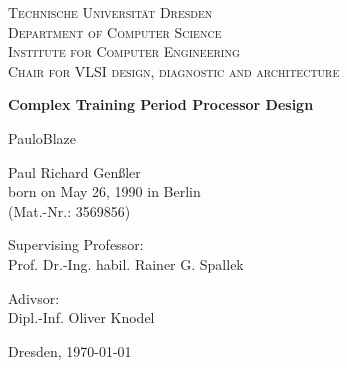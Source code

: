 \documentclass[11pt, a4paper, twoside, cleardoubleempty, openright, pointlessnumbers]{scrreprt} %
\newcommand{\getTitle}{PauloBlaze}
\begin{document}
		
	\begin{center}
	\thispagestyle{empty}
	\mbox{}
	\vspace{3\baselineskip}
	
	\textsc{\Large Technische Universität Dresden\\
		Department of Computer Science\\
		Institute for Computer Engineering\\
		Chair for VLSI design, diagnostic and architecture\\ \vspace{2\baselineskip} }
		
	\vspace{2\baselineskip}
		
	\textbf{\LARGE Complex Training Period Processor Design \vspace{\baselineskip}}
	
	\vspace{2\baselineskip}
	
	\Large \getTitle{}

	\vspace{2\baselineskip}
		
	\large Paul Richard Genßler\\
	\small born on May 26, 1990 in Berlin\\
	\small (Mat.-Nr.: 3569856)\\
	\vspace{2\baselineskip}


	\end{center}

	\vspace{6\baselineskip}
	\begin{minipage}[t]{8cm}
		{\small Supervising Professor:}\\\large Prof. Dr.-Ing. habil. Rainer G. Spallek\\
	\end{minipage}
	
	\begin{minipage}[t]{8cm}
	{\small Adivsor:}\\\large Dipl.-Inf. Oliver Knodel\\
	\end{minipage}

	\vspace{2\baselineskip}


	Dresden, \today
	
	
	\newpage
	
	
	\newpage
	\mbox{}
	\thispagestyle{empty}
	\newpage
	
\end{document}
